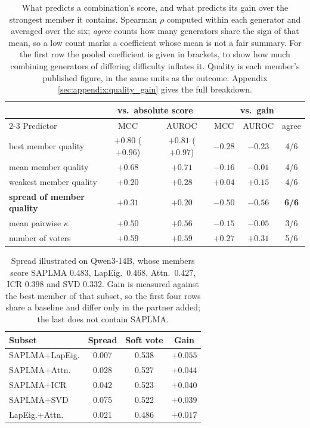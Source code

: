 \begin{table}[t]\centering\footnotesize
  \caption{What predicts a combination's score, and what predicts its gain over the
  strongest member it contains. Spearman $\rho$ computed within each generator and
  averaged over the six; \emph{agree} counts how many generators share the sign of
  that mean, so a low count marks a coefficient whose mean is not a fair summary.
  For the first row the pooled coefficient is given in brackets, to show how much
  combining generators of differing difficulty inflates it. Quality is each member's
  published figure, in the same units as the outcome. Appendix
  \ref{sec:appendix:quality_gain} gives the full breakdown.}
  \label{tab:quality_gain}
  \begin{tabular}{l c c c c c}
    \hline
    & \multicolumn{2}{c}{vs.\ absolute score} & \multicolumn{3}{c}{vs.\ gain} \\
    \cline{2-3}\cline{4-6}
    Predictor & MCC & AUROC & MCC & AUROC & agree \\
    \hline
    best member quality & $+0.80$ ($+0.96$) & $+0.81$ ($+0.97$) & $-0.28$ & $-0.23$ & 4/6 \\
    mean member quality & $+0.68$ & $+0.71$ & $-0.16$ & $-0.01$ & 4/6 \\
    weakest member quality & $+0.20$ & $+0.28$ & $+0.04$ & $+0.15$ & 4/6 \\
    \textbf{spread of member quality} & $+0.31$ & $+0.20$ & $\mathbf{-0.50}$ & $\mathbf{-0.56}$ & \textbf{6/6} \\
    mean pairwise $\kappa$ & $+0.50$ & $+0.56$ & $-0.15$ & $-0.05$ & 3/6 \\
    number of voters & $+0.59$ & $+0.59$ & $+0.27$ & $+0.31$ & 5/6 \\
    \hline\end{tabular}\end{table}

\begin{table}[t]\centering\footnotesize
  \caption{Spread illustrated on Qwen3-14B, whose members score SAPLMA $0.483$,
  LapEig.\ $0.468$, Attn.\ $0.427$, ICR $0.398$ and SVD $0.332$. Gain is measured
  against the best member of that subset, so the first four rows share a baseline
  and differ only in the partner added; the last does not contain SAPLMA.}
  \label{tab:spread_example}
  \begin{tabular}{l c c c}
    \hline
    Subset & Spread & Soft vote & Gain \\
    \hline
    SAPLMA+LapEig. & 0.007 & 0.538 & $+0.055$ \\
    SAPLMA+Attn. & 0.028 & 0.527 & $+0.044$ \\
    SAPLMA+ICR & 0.042 & 0.523 & $+0.040$ \\
    SAPLMA+SVD & 0.075 & 0.522 & $+0.039$ \\
    LapEig.+Attn. & 0.021 & 0.486 & $+0.017$ \\
    \hline\end{tabular}\end{table}
